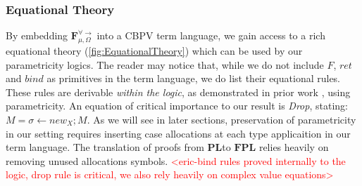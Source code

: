 \documentclass[acmsmall]{acmart}
\newcommand{\eric}[1]{\textcolor{red}{ <eric-#1> }}
\newcommand{\source}{$\mathbf{F}_{\mu,\Omega}^{\forall\to}\;$}
\newcommand{\pl}{$\mathbf{PL}$}
\newcommand{\fpl}{$\mathbf{FPL}$}
\begin{document}
\subsubsection{Equational Theory}\label{sec:EquationalTheory}
By embedding \source into a CBPV term language, we gain access to a rich equational theory (\cref{fig:EquationalTheory}) which can be used by our parametricity logics. The reader may notice that, while we do not include $F$, $ret$ and $bind$ as primitives in the term language, we do list their equational rules. These rules are derivable \textit{within the logic}, as demonstrated in prior work \cite{PEModel}, using parametricity. An equation of critical importance to our result is \textit{Drop}, stating: $M = \sigma \leftarrow new_X;M$. As we will see in later sections, preservation of parametricity in our setting requires inserting case allocations at each type applicaition in our term language. The translation of proofs from \pl to \fpl\; relies heavily on removing unused allocations symbols. 
\eric{bind rules proved internally to the logic, drop rule is critical, we also rely heavily on complex value equations}
\end{document}
